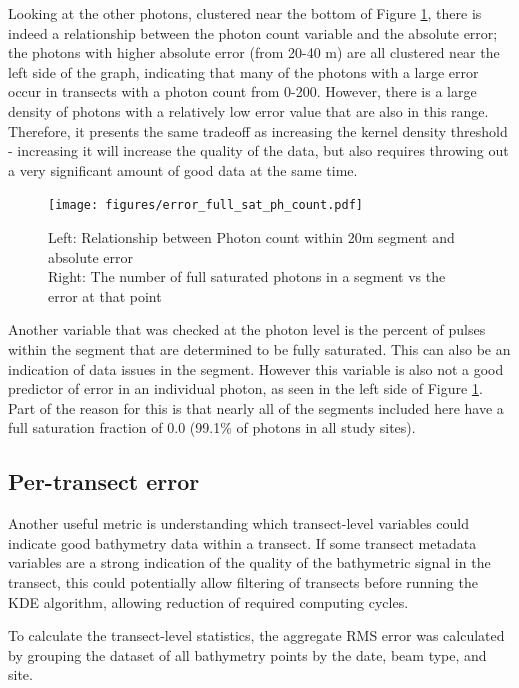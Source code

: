 Looking at the other photons, clustered near the bottom of Figure \ref{fig:error-photon}, there is indeed a relationship between the photon count variable and the absolute error; the photons with higher absolute error (from 20-40 m) are all clustered near the left side of the graph, indicating that many of the photons with a large error occur in transects with a photon count from 0-200. However, there is a large density of photons with a relatively low error value that are also in this range. Therefore, it presents the same tradeoff as increasing the kernel density threshold - increasing it will increase the quality of the data, but also requires throwing out a very significant amount of good data at the same time.

\begin{figure}[!ht]
    \centering
    \texttt{[image: figures/error\_full\_sat\_ph\_count.pdf]}
    \caption[Photon error vs segment photon count and the fraction of fully-saturated returns in the segment]{Left: Relationship between Photon count within 20m segment and absolute error \\ Right: The number of full saturated photons in a segment vs the error at that point}
    \label{fig:error-photon}
\end{figure}

Another variable that was checked at the photon level is the percent of pulses within the segment that are determined to be fully saturated. This can also be an indication of data issues in the segment. However this variable is also not a good predictor of error in an individual photon, as seen in the left side of Figure \ref{fig:error-photon}. Part of the reason for this is that nearly all of the segments included here have a full saturation fraction of 0.0 (99.1\% of photons in all study sites).

\subsection{Per-transect error}

Another useful metric is understanding which transect-level variables could indicate good bathymetry data within a transect. If some transect metadata variables are a strong indication of the quality of the bathymetric signal in the transect, this could potentially allow filtering of transects before running the KDE algorithm, allowing reduction of required computing cycles.

To calculate the transect-level statistics, the aggregate RMS error was calculated by grouping the dataset of all bathymetry points by the date, beam type, and site.

